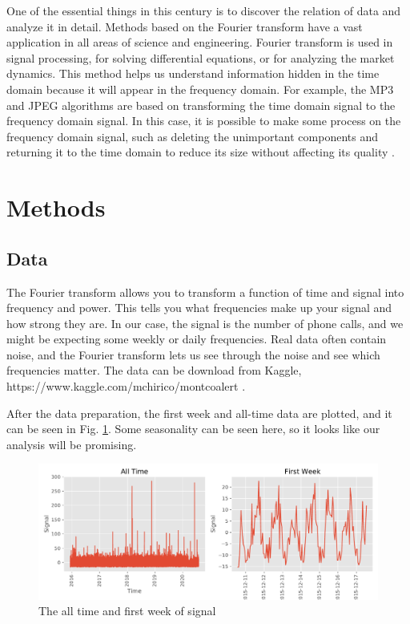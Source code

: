 \documentclass[12pt]{article}
\begin{document}
One of the essential things in this century is to discover the relation of data and analyze it in detail. Methods based on the Fourier transform have a vast application in all areas of science and engineering. Fourier transform is used in signal processing, for solving differential equations, or for analyzing the market dynamics. This method helps us understand information hidden in the time domain because it will appear in the frequency domain. For example, the MP3 and JPEG algorithms are based on transforming the time domain signal to the frequency domain signal. In this case, it is possible to make some process on the frequency domain signal, such as deleting the unimportant components and returning it to the time domain to reduce its size without affecting its quality \cite{F}.

\section{Methods}
\subsection{Data}

The Fourier transform allows you to transform a function of time and signal into frequency and power. This tells you what frequencies make up your signal and how strong they are. In our case, the signal is the number of phone calls, and we might be expecting some weekly or daily frequencies. Real data often contain noise, and the Fourier transform lets us see through the noise and see which frequencies matter. The data can be download from Kaggle, https://www.kaggle.com/mchirico/montcoalert .

After the data preparation, the first week and all-time data are plotted, and it can be seen in Fig. \ref{fig:data}. Some seasonality can be seen here, so it looks like our analysis will be promising. 

\begin{figure}[h]
    \centering
    \includegraphics[scale = 0.55]{data.pdf}
    \caption{The all time and first week of signal}
    \label{fig:data}
\end{figure}
\end{document}
